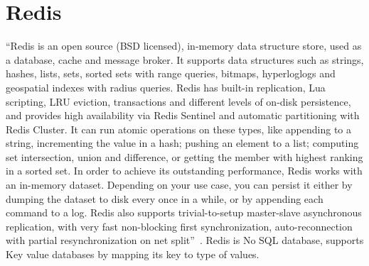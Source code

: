 \section{Redis}

``Redis is an open source (BSD licensed), in-memory data structure store, used
as a database, cache and message broker. It supports data structures such as
strings, hashes, lists, sets, sorted sets with range queries, bitmaps, 
hyperloglogs and geospatial indexes with radius queries. Redis has built-in 
replication, Lua scripting, LRU eviction, transactions and different levels 
of on-disk persistence, and provides high availability via Redis Sentinel and
automatic partitioning with Redis Cluster.
It can run atomic operations on these types, like appending to a string, 
incrementing the value in a hash; pushing an element to a list; computing set
intersection, union and difference, or getting the member with highest 
ranking in a sorted set.
In order to achieve its outstanding performance, Redis works with an in-memory
dataset. Depending on your use case, you can persist it either by dumping the
dataset to disk every once in a while, or by appending each command to a log.
Redis also supports trivial-to-setup master-slave asynchronous replication, 
with very fast non-blocking first synchronization, auto-reconnection with 
partial resynchronization on net split''~\cite{hid-sp18-520-Redis}.
Redis is No SQL database, supports Key value databases by mapping its key
to type of values.
